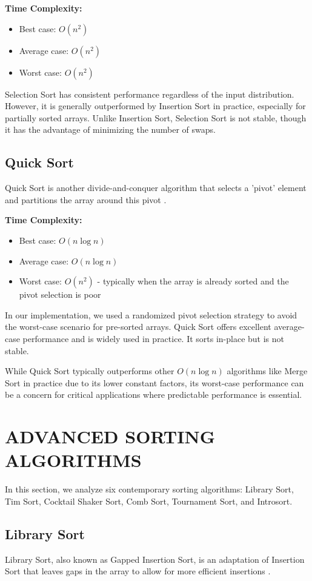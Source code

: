 \documentclass[sigconf]{acmart}
\begin{document}
\textbf{Time Complexity:}
\begin{itemize}
    \item Best case: $O(n^2)$
    \item Average case: $O(n^2)$
    \item Worst case: $O(n^2)$
\end{itemize}

Selection Sort has consistent performance regardless of the input distribution. However, it is generally outperformed by Insertion Sort in practice, especially for partially sorted arrays. Unlike Insertion Sort, Selection Sort is not stable, though it has the advantage of minimizing the number of swaps.

\subsection{Quick Sort}
Quick Sort is another divide-and-conquer algorithm that selects a 'pivot' element and partitions the array around this pivot \cite{hoare1961algorithm}.

\textbf{Time Complexity:}
\begin{itemize}
    \item Best case: $O(n \log n)$
    \item Average case: $O(n \log n)$
    \item Worst case: $O(n^2)$ - typically when the array is already sorted and the pivot selection is poor
\end{itemize}

In our implementation, we used a randomized pivot selection strategy to avoid the worst-case scenario for pre-sorted arrays. Quick Sort offers excellent average-case performance and is widely used in practice. It sorts in-place but is not stable.

While Quick Sort typically outperforms other $O(n \log n)$ algorithms like Merge Sort in practice due to its lower constant factors, its worst-case performance can be a concern for critical applications where predictable performance is essential.

\section{ADVANCED SORTING ALGORITHMS}
In this section, we analyze six contemporary sorting algorithms: Library Sort, Tim Sort, Cocktail Shaker Sort, Comb Sort, Tournament Sort, and Introsort.

\subsection{Library Sort}
Library Sort, also known as Gapped Insertion Sort, is an adaptation of Insertion Sort that leaves gaps in the array to allow for more efficient insertions \cite{librarysort, bender2006insertion}.
\end{document}
